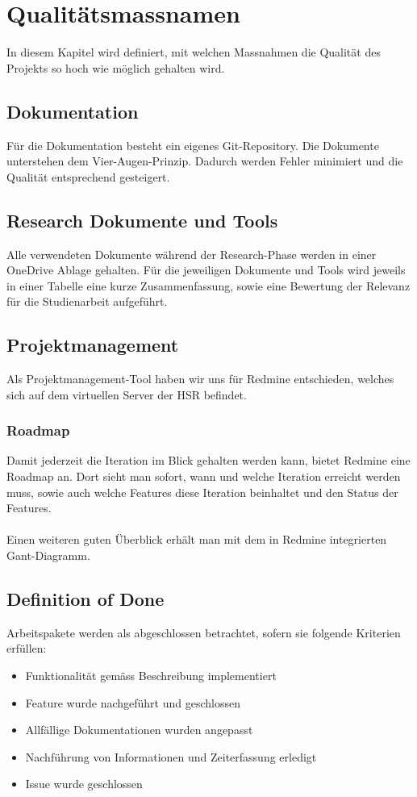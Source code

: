 \section{Qualitätsmassnamen}
In diesem Kapitel wird definiert, mit welchen Massnahmen die Qualität des Projekts so hoch wie möglich gehalten wird.

\subsection{Dokumentation}
Für die Dokumentation besteht ein eigenes Git-Repository. Die Dokumente unterstehen dem Vier-Augen-Prinzip. Dadurch werden Fehler minimiert und die Qualität entsprechend gesteigert.

\subsection{Research Dokumente und Tools}
Alle verwendeten Dokumente während der Research-Phase werden in einer OneDrive Ablage gehalten. Für die jeweiligen Dokumente und Tools wird jeweils in einer Tabelle eine kurze Zusammenfassung, sowie eine Bewertung der Relevanz für die Studienarbeit aufgeführt.

\subsection{Projektmanagement}
Als Projektmanagement-Tool haben wir uns für Redmine entschieden, welches sich auf dem virtuellen Server der HSR befindet.

\subsubsection{Roadmap}
Damit jederzeit die Iteration im Blick gehalten werden kann, bietet Redmine eine Roadmap an. Dort sieht man sofort, wann und welche Iteration erreicht werden muss, sowie auch welche Features diese Iteration beinhaltet und den Status der Features.
\\\\
Einen weiteren guten Überblick erhält man mit dem in Redmine integrierten Gant-Diagramm.

\subsection{Definition of Done}
Arbeitspakete werden als abgeschlossen betrachtet, sofern sie folgende Kriterien erfüllen:
\begin{itemize}
    \item Funktionalität gemäss Beschreibung implementiert
    \item Feature wurde nachgeführt und geschlossen
    \item Allfällige Dokumentationen wurden angepasst
    \item Nachführung von Informationen und Zeiterfassung erledigt
    \item Issue wurde geschlossen
\end{itemize}

